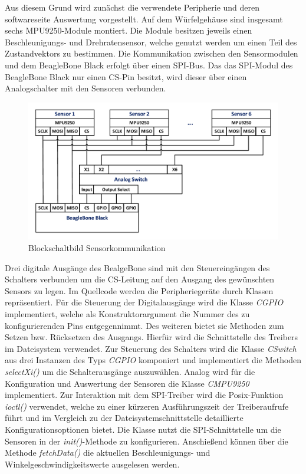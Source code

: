 Aus diesem Grund wird zunächst die verwendete Peripherie und deren softwareseite Auswertung vorgestellt. Auf dem Würfelgehäuse sind insgesamt sechs MPU9250-Module \cite{MPU9250} montiert. Die Module besitzen jeweils einen Beschleunigungs- und Drehratensensor, welche genutzt werden um einen Teil des Zustandvektors zu bestimmen. Die Kommunikation zwischen den Sensormodulen und dem BeagleBone Black erfolgt über einen SPI-Bus. Das das SPI-Modul des BeagleBone Black nur einen CS-Pin besitzt, wird dieser über einen Analogschalter \cite{MAX4617} mit den Sensoren verbunden.
\begin{figure}[!h]
\centering
\includegraphics[width=0.7\linewidth]{img/SW_0_Sensoren_BSB.pdf}
\caption{Blockschaltbild Sensorkommunikation}
\end{figure}
Drei digitale Ausgänge des BealgeBone sind mit den Steuereingängen des Schalters verbunden um die CS-Leitung auf den Ausgang des gewünschten Sensors zu legen.
Im Quellcode werden die Peripheriegeräte durch Klassen repräsentiert. Für die Steuerung der Digitalausgänge wird die Klasse \textit{CGPIO} implementiert, welche als Konstruktorargument die Nummer des zu konfigurierenden Pins entgegennimmt. Des weiteren bietet sie Methoden zum Setzen bzw. Rücksetzen des Ausgangs. Hierfür wird die Schnittstelle des Treibers im Dateisystem verwendet. Zur Steuerung des Schalters wird die Klasse \textit{CSwitch} aus drei Instanzen des Typs \textit{CGPIO} komponiert und implementiert die Methoden \textit{selectXi()} um die Schalterausgänge auszuwählen.
Analog wird für die Konfiguration und Auswertung der Sensoren die Klasse \textit{CMPU9250} implementiert. Zur Interaktion mit dem SPI-Treiber wird die Posix-Funktion \textit{ioctl()} verwendet, welche zu einer kürzeren Ausführungszeit der Treiberaufrufe führt und im Vergleich zu der Dateisystemschnittstelle detaillierte Konfigurationsoptionen bietet. Die Klasse nutzt die SPI-Schnittstelle um die Sensoren in der \textit{init()}-Methode zu konfigurieren. Anschießend können über die Methode \textit{fetchData()} die aktuellen Beschleunigungs- und Winkelgeschwindigkeitswerte ausgelesen werden.

